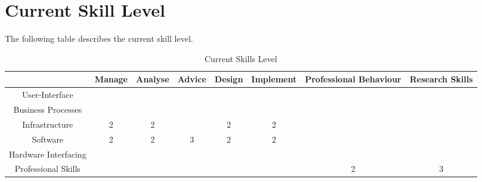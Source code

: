 
\section{Current Skill Level}
\label{sec:current}

The following table describes the current skill level. 

\begin{table}[H]
	\centering
	\begin{tabular}{|c|c|c|c|c|c|c|c|}
		\hline
		& Manage & Analyse & Advice & Design & Implement & Professional Behaviour & Research Skills \\ \hline
		User-Interface & & & & & & & \\ \hline
		Business Processes & & & & & & & \\ \hline
		Infrastructure & 2 & 2 & & 2 & 2 & & \\ \hline
		Software & 2 & 2 & 3 & 2 & 2 & & \\ \hline
		Hardware Interfacing & & & & & & & \\ \hline
		Professional Skills & & & & & & 2 & 3 \\ \hline
	\end{tabular}
	\caption{Current Skills Level}
	\label{currentskills}
\end{table}